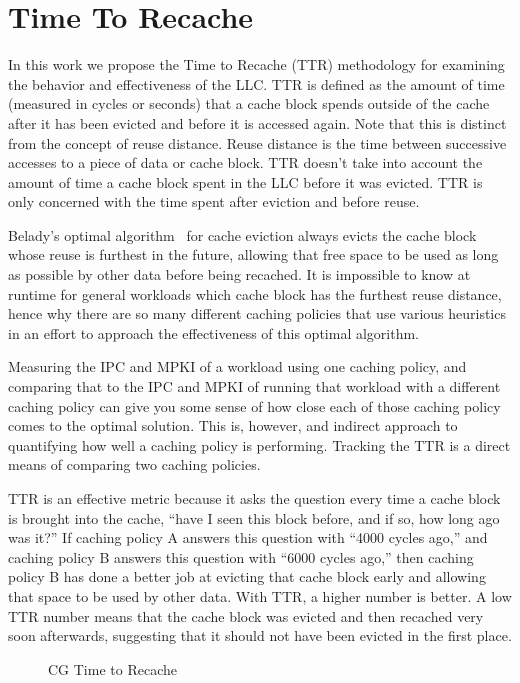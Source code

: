 \section{Time To Recache}

In this work we propose the Time to Recache (TTR) methodology for
examining the behavior and effectiveness of the LLC.  TTR is defined
as the amount of time (measured in cycles or seconds) that a cache
block spends outside of the cache after it has been evicted and
before it is accessed again.  Note that this is distinct from the
concept of reuse distance.  Reuse distance is the time between
successive accesses to a piece of data or cache block.  TTR doesn't
take into account the amount of time a cache block spent in the LLC
before it was evicted.  TTR is only concerned with the time spent
after eviction and before reuse.

Belady's optimal algorithm~\cite{belady66} for cache eviction always evicts
the cache block whose reuse is furthest in the future, allowing that
free space to be used as long as possible by other data before being
recached.  It is impossible to know at runtime for general workloads
which cache block has the furthest reuse distance, hence why there are
so many different caching policies that use various heuristics in an
effort to approach the effectiveness of this optimal algorithm.

Measuring the IPC and MPKI of a workload using one caching policy, and
comparing that to the IPC and MPKI of running that workload with a
different caching policy can give you some sense of how close each of
those caching policy comes to the optimal solution.  This is,
however, and indirect approach to quantifying how well a caching
policy is performing.  Tracking the TTR is a direct means of
comparing two caching policies.

TTR is an effective metric because it asks the question every time a
cache block is brought into the cache, ``have I seen this block
before, and if so, how long ago was it?''  If caching policy A answers
this question with ``4000 cycles ago,'' and caching policy B answers
this question with ``6000 cycles ago,'' then caching policy B has done
a better job at evicting that cache block early and allowing that
space to be used by other data.  With TTR, a higher number is better.
A low TTR number means that the cache block was evicted and then
recached very soon afterwards, suggesting that it should not have
been evicted in the first place.

\begin{figure*}
  \centerline{
  }
\caption{CG Time to Recache}
\label{Fig:performance:cg}
\end{figure*}

